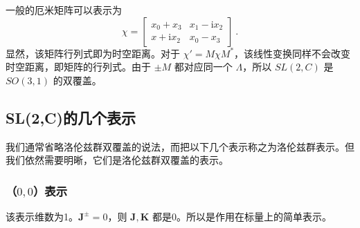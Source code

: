 一般的厄米矩阵可以表示为
\begin{equation}
\chi=\left[\begin{array}{cc}
x_0+x_3 & x_1-\mathrm{i} x_2 \\
x+\mathrm{i}x_2 & x_0-x_3
\end{array}\right]~.
\end{equation}
显然，该矩阵行列式即为时空距离。对于 $\chi'=M \chi M^{*}$，该线性变换同样不会改变时空距离，即矩阵的行列式。由于 $\pm M$ 都对应同一个 $\Lambda$，所以 $SL(2,C)$ 是 $SO(3,1)$ 的双覆盖。

\subsection{SL(2,C)的几个表示}
我们通常省略洛伦兹群双覆盖的说法，而把以下几个表示称之为洛伦兹群表示。但我们依然需要明晰，它们是洛伦兹群双覆盖的表示。

\subsubsection{（$0,0$）表示}
该表示维数为1。$\mathbf{J}^{\pm}=0$，则 $\mathbf{J},\mathbf{K}$ 都是0。所以是作用在标量上的简单表示。

